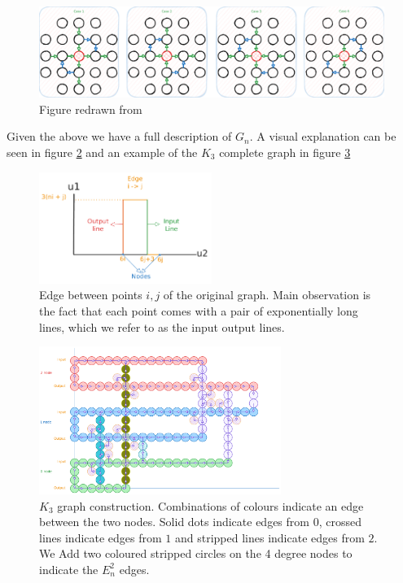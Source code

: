 \begin{figure}[h!]
    \centering
    \includegraphics[width=\textwidth]{Chapter2/rleafd.pdf}
    \caption{Figure redrawn from \cite{chen_Complexity2DDiscrete_2009}}
    \label{fig:chap-2:rleafd-new-edges}
\end{figure}


Given the above we have a full description of $G_n$. A visual explanation
can be seen in figure \ref{fig:chap-2:edge-rleaf} and an example of the $K_3$ complete graph in
figure \ref{fig:chap-2:rleaf-k3}

\begin{figure}[h!]
    \centering
    \includegraphics[width=0.5\textwidth]{Chapter2/rleaf-edge-example.pdf}
    \caption{Edge between points $i,j$ of the original graph. Main observation is the fact that each point comes with a pair of
        exponentially long lines, which we refer to as the input output lines.}
    \label{fig:chap-2:edge-rleaf}
\end{figure}

\begin{figure}[h!]
    \centering
    \includegraphics[width=0.7\textwidth]{Chapter2/rleaf-k3-example.pdf}
    \caption{$K_3$ graph construction. Combinations of colours indicate an edge between the two nodes. Solid dots indicate edges from $0$,
        crossed lines indicate edges from $1$ and stripped lines indicate edges from $2$. We Add two coloured stripped circles on the
        4 degree nodes to indicate the $E^2_n$ edges.}
    \label{fig:chap-2:rleaf-k3}
\end{figure}


